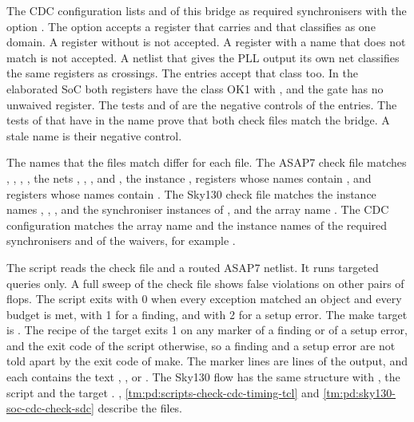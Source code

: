 The CDC configuration lists  and  of this bridge as required synchronisers with the option . The option accepts a register that carries  and that  classifies as one domain. A register without  is not accepted. A register with a name that does not match is not accepted. A netlist that gives the PLL output its own net classifies the same registers as crossings. The entries accept that class too. In the elaborated SoC both registers have the class OK1 with , and the gate has no unwaived register. The tests  and  of  are the negative controls of the entries. The tests of  that have  in the name prove that both check files match the bridge. A stale name is their negative control.

The names that the files match differ for each file. The ASAP7 check file matches , , , , the nets , , ,  and , the instance , registers whose names contain , and registers whose names contain . The Sky130 check file matches the instance names , , ,  and the synchroniser instances of , and the array name . The CDC configuration matches the array name  and the instance names of the required synchronisers and of the waivers, for example .

The script  reads the check file and a routed ASAP7 netlist. It runs targeted queries only. A full sweep of the check file shows false violations on other pairs of flops. The script exits with 0 when every exception matched an object and every budget is met, with 1 for a finding, and with 2 for a setup error. The make target is . The recipe of the target exits 1 on any marker of a finding or of a setup error, and the exit code of the script otherwise, so a finding and a setup error are not told apart by the exit code of make. The marker lines are  lines of the output, and each contains the text , ,  or . The Sky130 flow has the same structure with , the script  and the target . , \cref{tm:pd:scripts-check-cdc-timing-tcl} and \cref{tm:pd:sky130-soc-cdc-check-sdc} describe the files.

